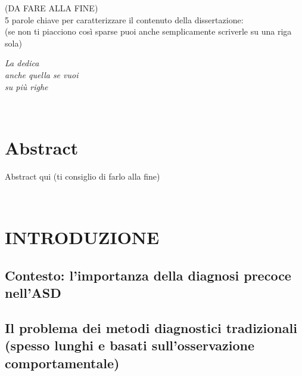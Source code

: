 \documentclass[12pt,a4paper,twoside]{book}
\begin{document}
\restoregeometry
\newpage
\begin{center}
    (DA FARE ALLA FINE)\\
    5 parole chiave per caratterizzare il contenuto della dissertazione:\\ (se non ti piacciono così sparse puoi anche semplicamente scriverle su una riga sola)
\end{center}

\newpage

\topmargin=6.5cm
\begin{flushright}
\emph{
\LARGE{La dedica}\\\vspace{2mm}
\LARGE{anche quella se vuoi}\\\vspace{3mm} 
\LARGE{su più righe} 
}
\end{flushright}
\newpage~\newpage
{}
\chapter*{Abstract}
Abstract qui (ti consiglio di farlo alla fine)

\topmargin=-1cm
\tableofcontents
\thispagestyle{empty}
\listoftables
\thispagestyle{empty}
\listoffigures
\thispagestyle{empty}
\newpage~\newpage


\setcounter{chapter}{-1}
\raggedbottom
\chapter{INTRODUZIONE} \label{chap:intro}
\pagestyle{plain}
\setcounter{page}{1}
\section{Contesto: l'importanza della diagnosi precoce nell'ASD}
\section{Il problema dei metodi diagnostici tradizionali (spesso lunghi e basati sull'osservazione comportamentale)}
\end{document}
